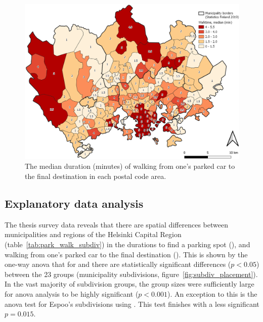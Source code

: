 \begin{figure}[H]%
    \centering
    \includegraphics[width=\textwidth]{images/thesis_postalvis_walkmedian.png}
    \caption[Walktime, median, in the research area]{The median duration (minutes) of walking from one's parked car to the final destination in each postal code area.}%
    \label{fig:postalvis_walkmedian}%
\end{figure}

\newpage
\subsection{Explanatory data analysis}
\justify

The thesis survey data reveals that there are spatial differences between municipalities and regions of the Helsinki Capital Region (table~\ref{tab:park_walk_subdiv}) in the durations to find a parking spot (), and walking from one's parked car to the final destination (). This is shown by the one-way \acrfull{anova} that for  and  there are statistically significant differences ($p < 0.05$) between the 23 groups (municipality subdivisions, figure~\ref{fig:subdiv_placement}). In the vast majority of subdivision groups, the group sizes were sufficiently large for \acrshort{anova} analysis to be highly significant ($p < 0.001$). An exception to this is the \acrshort{anova} test for Espoo's subdivisions using . This test finishes with a less significant $p = 0.015$.

